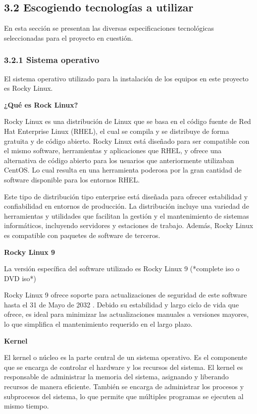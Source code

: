 \begin{spacing}{1.5}
  
    \subsection{3.2 Escogiendo tecnologías a utilizar}
    En esta sección se presentan las diversas especificaciones tecnológicas seleccionadas para el proyecto en cuestión.

    \subsubsection{3.2.1 Sistema operativo}
    El sistema operativo utilizado para la instalación de los equipos en este proyecto es Rocky Linux.

    \textbf{¿Qué es Rock Linux?}
    
    Rocky Linux es una distribución de Linux que se basa en el código fuente de Red Hat Enterprise Linux (RHEL), el cual se compila y se distribuye de forma gratuita y de código abierto. Rocky Linux está diseñado para ser compatible con el mismo software, herramientas y aplicaciones que RHEL, y ofrece una alternativa de código abierto para los usuarios que anteriormente utilizaban CentOS. Lo cual resulta en una herramienta poderosa por la gran cantidad de software disponible para los entornos RHEL.

    Este tipo de distribución tipo enterprise está diseñada para ofrecer estabilidad y confiabilidad en entornos de producción. La distribución incluye una variedad de herramientas y utilidades que facilitan la gestión y el mantenimiento de sistemas informáticos, incluyendo servidores y estaciones de trabajo. Además, Rocky Linux es compatible con paquetes de software de terceros. \cite{RL-1}

    \textbf{Rocky Linux 9}
    
    La versión específica del software utilizado es Rocky Linux 9 (*complete iso o DVD iso*) \cite{RL9-download-1} \cite{RL9-release-1}  \cite{RHEL-release-1} 

    Rocky Linux 9 ofrece soporte para actualizaciones de seguridad de este software hasta el 31 de Mayo de 2032 \cite{RL9-EOL-1}. Debido su estabilidad y largo ciclo de vida que ofrece, es ideal para minimizar las actualizaciones manuales a versiones mayores, lo que simplifica el mantenimiento requerido en el largo plazo.

    \textbf{Kernel}

    El kernel o núcleo es la parte central de un sistema operativo. Es el componente que se encarga de controlar el hardware y los recursos del sistema. El kernel es responsable de administrar la memoria del sistema, asignando y liberando recursos de manera eficiente. También se encarga de administrar los procesos y subprocesos del sistema, lo que permite que múltiples programas se ejecuten al mismo tiempo.


\end{spacing}
